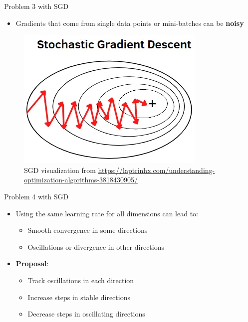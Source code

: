 \documentclass[serif, aspectratio=169]{beamer}
\begin{document}
\begin{frame}{Problem 3 with SGD}
    \begin{minipage}{0.4\textwidth}
        \begin{itemize}
        \item Gradients that come from single data points or mini-batches can be \textbf{noisy}
        \end{itemize}
    \end{minipage}%
    \begin{minipage}{0.6\textwidth}
        \centering
        \begin{figure}
            \centering
            \includegraphics[width=0.6\linewidth]{pic/sgd_mlexplained.png}
            \caption{\footnotesize SGD visualization from \url{https://laptrinhx.com/understanding-optimization-algorithms-3818430905/}}
        \end{figure}
    \end{minipage}
\end{frame}

\begin{frame}{Problem 4 with SGD}
    \begin{itemize}
        \item Using the same learning rate for all dimensions can lead to:
        \begin{itemize}
            \item Smooth convergence in some directions
            \item Oscillations or divergence in other directions
        \end{itemize}
        \item \textbf{Proposal}:
        \begin{itemize}
            \item Track oscillations in each direction
            \item Increase steps in stable directions
            \item Decrease steps in oscillating directions
        \end{itemize}
    \end{itemize}
\end{frame}
\end{document}
